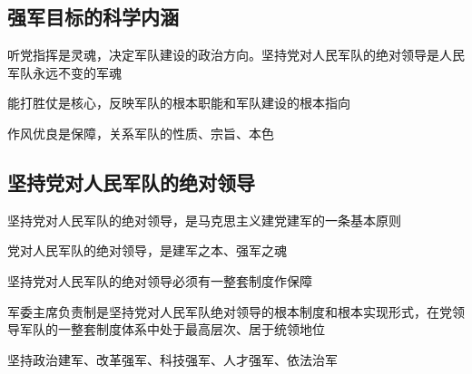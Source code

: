 \documentclass[11pt, a4paper]{article}
\begin{document}
\subsection*{强军目标的科学内涵}

听党指挥是灵魂，决定军队建设的政治方向。坚持党对人民军队的绝对领导是人民军队永远不变的军魂

能打胜仗是核心，反映军队的根本职能和军队建设的根本指向

作风优良是保障，关系军队的性质、宗旨、本色

\subsection*{坚持党对人民军队的绝对领导}

坚持党对人民军队的绝对领导，是马克思主义建党建军的一条基本原则

党对人民军队的绝对领导，是建军之本、强军之魂

坚持党对人民军队的绝对领导必须有一整套制度作保障

军委主席负责制是坚持党对人民军队绝对领导的根本制度和根本实现形式，在党领导军队的一整套制度体系中处于最高层次、居于统领地位

坚持政治建军、改革强军、科技强军、人才强军、依法治军
\end{document}
